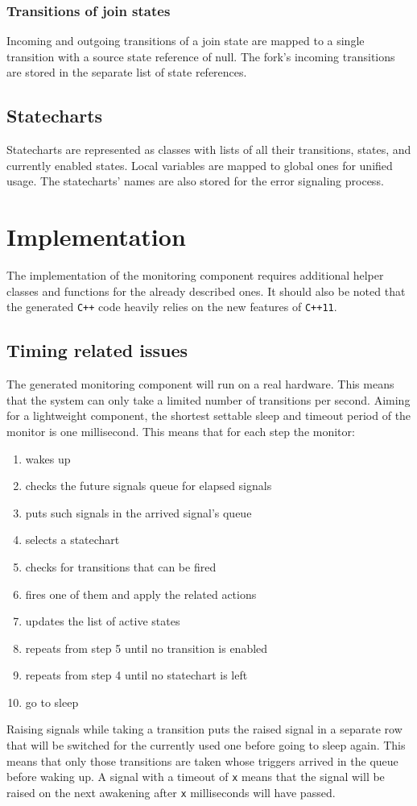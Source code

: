 {    \subsubsection{Transitions of join states}
Incoming and outgoing transitions of a join state are mapped to a single transition with a source state reference of null. The fork's incoming transitions are stored in the separate list of state references.
  \subsection{Statecharts}
Statecharts are represented as classes with lists of all their transitions, states, and currently enabled states. Local variables are mapped to global ones for unified usage. The statecharts' names are also stored for the error signaling process.
\section{Implementation}
The implementation of the monitoring component requires additional helper classes and functions for the already described ones. It should also be noted that the generated \verb!C++! code heavily relies on the new features of \verb!C++11!.
  \subsection{Timing related issues}
The generated monitoring component will run on a real hardware. This means that the system can only take a limited number of transitions per second. Aiming for a lightweight component, the shortest settable sleep and timeout period of the monitor is one millisecond. This means that for each step the monitor:
\begin{enumerate}
  \item wakes up
  \item checks the future signals queue for elapsed signals
  \item puts such signals in the arrived signal's queue
  \item selects a statechart
  \item checks for transitions that can be fired
  \item fires one of them and apply the related actions
  \item updates the list of active states
  \item repeats from step 5 until no transition is enabled
  \item repeats from step 4 until no statechart is left
  \item go to sleep
\end{enumerate}
Raising signals while taking a transition puts the raised signal in a separate row that will be switched for the currently used one before going to sleep again. This means that only those transitions are taken whose triggers arrived in the queue before waking up. A signal with a timeout of \verb!x! means that the signal will be raised on the next awakening after \verb!x! milliseconds will have passed.
}
